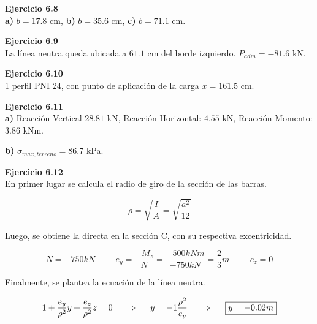 \textbf{Ejercicio 6.8}\\

\textbf{a)} 
$b=17.8$ cm,
\textbf{b)} $b=35.6$ cm, \textbf{c)} $b=71.1$ cm.\newline

\textbf{Ejercicio 6.9}\\

La línea neutra queda ubicada a $61.1$ cm del borde izquierdo. $P_{adm} = -81.6$ kN.\newline

\textbf{Ejercicio 6.10}\\

1 perfil PNI 24, con punto de aplicación de la carga $x = 161.5$ cm.\newline

\textbf{Ejercicio 6.11}\\

\textbf{a)}  Reacción Vertical $28.81$ kN, Reacción Horizontal: $4.55$ kN, Reacción Momento: $3.86$ kNm.

\textbf{b)} $\sigma_{max,terreno} = 86.7$ kPa.\newline



\textbf{Ejercicio 6.12}\\

En primer lugar se calcula el radio de giro de la sección de las barras. 

$$\rho = \sqrt{\frac{I}{A}} = \sqrt{\frac{a^2}{12}}$$

Luego, se obtiene la directa en la sección C, con su respectiva excentricidad. 

$$ N = -750kN \hspace{1cm} e_y = \frac{-M_z}{N} = \frac{-500kNm}{-750kN} = \frac{2}{3}m\hspace{1cm} e_z = 0$$

Finalmente, se plantea la ecuación de la línea neutra.

$$ 1+ \frac{e_y}{\rho^2} y + \frac{e_z}{\rho^2} z = 0 \hspace{0.5cm} \Rightarrow \hspace{0.5cm} y = -1 \frac{\rho^2}{e_y} \hspace{0.5cm} \Rightarrow \hspace{0.5cm} \boxed{y = -0.02m}$$

